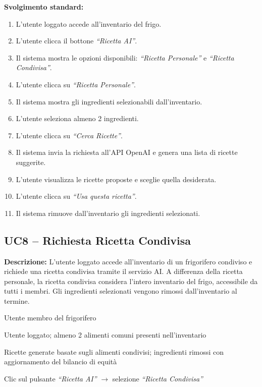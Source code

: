 \documentclass[12pt,a4paper,twoside]{report}
\newenvironment{ucbox}{%
  \begin{mdframed}[
    backgroundcolor=ucbg,
    linecolor=ucborder,
    linewidth=1pt,
    innerleftmargin=10pt,
    innerrightmargin=10pt,
    innertopmargin=8pt,
    innerbottommargin=8pt,
    roundcorner=4pt
  ]
}{%
  \end{mdframed}
}
\begin{document}
\textbf{Svolgimento standard:}
\begin{enumerate}
  \item L'utente loggato accede all'inventario del frigo.
  \item L'utente clicca il bottone \textit{``Ricetta AI''}.
  \item Il sistema mostra le opzioni disponibili: \textit{``Ricetta Personale''} e \textit{``Ricetta Condivisa''}.
  \item L'utente clicca su \textit{``Ricetta Personale''}.
  \item Il sistema mostra gli ingredienti selezionabili dall'inventario.
  \item L'utente seleziona almeno 2 ingredienti.
  \item L'utente clicca su \textit{``Cerca Ricette''}.
  \item Il sistema invia la richiesta all'API OpenAI e genera una lista di ricette suggerite.
  \item L'utente visualizza le ricette proposte e sceglie quella desiderata.
  \item L'utente clicca su \textit{``Usa questa ricetta''}.
  \item Il sistema rimuove dall'inventario gli ingredienti selezionati.
\end{enumerate}


\newpage
\subsection{UC8 -- Richiesta Ricetta Condivisa}

\begin{ucbox}
\textbf{Descrizione:} L'utente loggato accede all'inventario di un frigorifero condiviso e richiede una ricetta condivisa tramite il servizio AI. A differenza della ricetta personale, la ricetta condivisa considera l'intero inventario del frigo, accessibile da tutti i membri. Gli ingredienti selezionati vengono rimossi dall'inventario al termine.

\begin{description}[leftmargin=4cm, style=sameline]
  \item[Attori Coinvolti:] Utente membro del frigorifero
  \item[Precondizione:] Utente loggato; almeno 2 alimenti comuni presenti nell'inventario
  \item[Postcondizione:] Ricette generate basate sugli alimenti condivisi; ingredienti rimossi con aggiornamento del bilancio di equità
  \item[Trigger:] Clic sul pulsante \textit{``Ricetta AI''} $\to$ selezione \textit{``Ricetta Condivisa''}
\end{description}
\end{ucbox}
\end{document}
